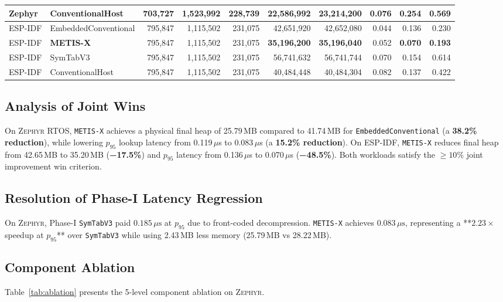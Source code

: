 \documentclass[conference]{IEEEtran}
\begin{document}
\begin{table}[t]
{\begin{tabular}{llrrrrrrrr}
Zephyr & ConventionalHost & 703,727 & 1,523,992 & 228,739 & 22,586,992 & 23,214,200 & 0.076 & 0.254 & 0.569 \\
\midrule
ESP-IDF & EmbeddedConventional & 795,847 & 1,115,502 & 231,075 & 42,651,920 & 42,652,080 & 0.044 & 0.136 & 0.230 \\
ESP-IDF & \textbf{METIS-X} & 795,847 & 1,115,502 & 231,075 & \textbf{35,196,200} & \textbf{35,196,040} & 0.052 & \textbf{0.070} & \textbf{0.193} \\
ESP-IDF & SymTabV3 & 795,847 & 1,115,502 & 231,075 & 56,741,632 & 56,741,744 & 0.070 & 0.154 & 0.614 \\
ESP-IDF & ConventionalHost & 795,847 & 1,115,502 & 231,075 & 40,484,448 & 40,484,304 & 0.082 & 0.137 & 0.422 \\
\bottomrule
\end{tabular}
}
\end{table}

\subsection{Analysis of Joint Wins}
On \textsc{Zephyr} RTOS, \texttt{METIS-X} achieves a physical final heap of 25.79\,MB compared to 41.74\,MB for \texttt{EmbeddedConventional} (a \textbf{38.2\% reduction}), while lowering $p_{95}$ lookup latency from 0.119\,$\mu$s to 0.083\,$\mu$s (a \textbf{15.2\% reduction}). On \textsc{ESP-IDF}, \texttt{METIS-X} reduces final heap from 42.65\,MB to 35.20\,MB (\textbf{−17.5\%}) and $p_{95}$ latency from 0.136\,$\mu$s to 0.070\,$\mu$s (\textbf{−48.5\%}). Both workloads satisfy the $\ge 10\%$ joint improvement win criterion.

\subsection{Resolution of Phase-I Latency Regression}
On \textsc{Zephyr}, Phase-I \texttt{SymTabV3} paid $0.185\,\mu\text{s}$ at $p_{95}$ due to front-coded decompression. \texttt{METIS-X} achieves $0.083\,\mu\text{s}$, representing a **$2.23\times$ speedup at $p_{95}$** over \texttt{SymTabV3} while using 2.43\,MB less memory (25.79\,MB vs 28.22\,MB).

\subsection{Component Ablation}
Table~\ref{tab:ablation} presents the 5-level component ablation on \textsc{Zephyr}.
\end{document}
